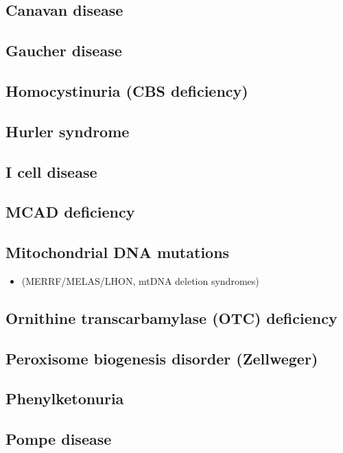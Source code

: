\documentclass{scrartcl}
\begin{document}
\subsection{Canavan disease}
\label{sec:org874bb2a}

\subsection{Gaucher disease}
\label{sec:org64ac203}

\subsection{Homocystinuria (CBS deficiency)}
\label{sec:org2b30fae}

\subsection{Hurler syndrome}
\label{sec:org9c33e7d}
\subsection{I cell disease}
\label{sec:org7ab9c1f}
\subsection{MCAD deficiency}
\label{sec:orge83bf7f}
\subsection{Mitochondrial DNA mutations}
\label{sec:org1005054}
\begin{itemize}
\item (MERRF/MELAS/LHON, mtDNA deletion syndromes)
\end{itemize}

\subsection{Ornithine transcarbamylase (OTC) deficiency}
\label{sec:org5e3d405}
\subsection{Peroxisome biogenesis disorder (Zellweger)}
\label{sec:org57b1696}
\subsection{Phenylketonuria}
\label{sec:org60cc590}
\subsection{Pompe disease}
\label{sec:org2d1d92a}
\end{document}
